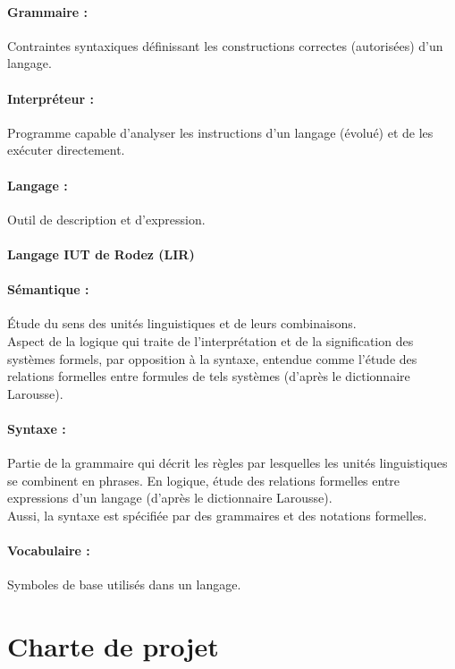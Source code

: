 \paragraph{Grammaire :}
Contraintes syntaxiques définissant les constructions correctes
(autorisées) d’un langage.

\paragraph{Interpréteur :}
Programme capable d’analyser les instructions d’un langage
(évolué) et de les exécuter directement.

\paragraph{Langage :}
Outil de description et d’expression.

\paragraph{Langage IUT de Rodez (LIR)}

\paragraph{Sémantique :}
Étude du sens des unités linguistiques et de leurs combinaisons.
\\Aspect de la logique qui traite de l'interprétation et de la
signification des systèmes formels, par opposition à la syntaxe, entendue
comme l'étude des relations formelles entre formules de tels systèmes
(d’après le dictionnaire Larousse).

\paragraph{Syntaxe :}
Partie de la grammaire qui décrit les règles par lesquelles les unités
linguistiques se combinent en phrases. En logique, étude des relations
formelles entre expressions d'un langage (d’après le dictionnaire
Larousse).
\\Aussi, la syntaxe est spécifiée par des grammaires et des notations
formelles.

\paragraph{Vocabulaire :}
Symboles de base utilisés dans un langage.

\section{Charte de projet}
